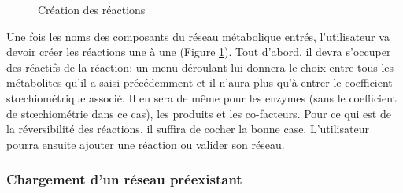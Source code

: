 \begin{figure}[!ht]
	\begin{center}
		\caption{Création des réactions}
  		\label{reactions}
  	\end{center}	
\end{figure}

Une fois les noms des composants du réseau métabolique entrés, l'utilisateur va devoir créer les réactions une à une (Figure \ref{reactions}). Tout d'abord, il devra s'occuper des réactifs de la réaction: un menu déroulant lui donnera le choix entre tous les métabolites qu'il a saisi précédemment et il n'aura plus qu'à entrer le coefficient stœchiométrique associé. Il en sera de même pour les enzymes (sans le coefficient de stœchiométrie dans ce cas), les produits et les co-facteurs. Pour ce qui est de la réversibilité des réactions, il suffira de cocher la bonne case. L'utilisateur pourra ensuite ajouter une réaction ou valider son réseau. 

\pagebreak

\subsubsection{Chargement d'un réseau préexistant}

